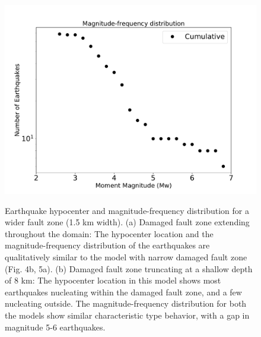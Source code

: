 \documentclass[11pt]{article}
\begin{document}
\begin{figure}[!htb]
{        \includegraphics[scale=0.25]{6b2.pdf}
    }
    \caption{Earthquake hypocenter and magnitude-frequency distribution for a wider fault zone (1.5 km width). (a) Damaged fault zone extending throughout the domain: The hypocenter location and the magnitude-frequency distribution of the earthquakes are qualitatively similar to the model with narrow damaged fault zone (Fig. 4b, 5a). (b) Damaged fault zone truncating at a shallow depth of 8 km: The hypocenter location in this model shows most earthquakes nucleating within the damaged fault zone, and a few nucleating outside. The magnitude-frequency distribution for both the models show similar characteristic type behavior, with a gap in magnitude 5-6 earthquakes.}
\end{figure}
\end{document}

